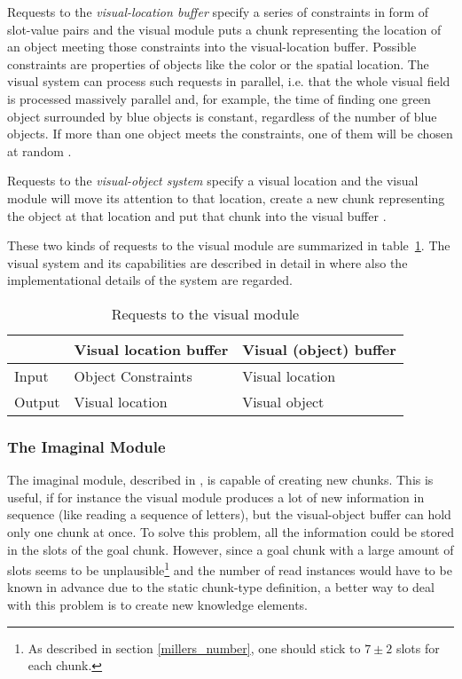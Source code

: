 Requests to the \emph{visual-location buffer} specify a series of constraints in form of slot-value pairs and the visual module puts a chunk representing the location of an object meeting those constraints into the visual-location buffer. Possible constraints are properties of objects like the color or the spatial location. The visual system can process such requests in parallel, i.e. that the whole visual field is processed massively parallel and, for example, the time of finding one green object surrounded by blue objects is constant, regardless of the number of blue objects. If more than one object meets the constraints, one of them will be chosen at random \cites[1039]{anderson_integrated_2004}[68]{anderson_how_2007}.

Requests to the \emph{visual-object system} specify a visual location and the visual module will move its attention to that location, create a new chunk representing the object at that location and put that chunk into the visual buffer \cite[unit 2, chapter 2.5.3]{actr_tutorial}. 

These two kinds of requests to the visual module are summarized in table~\ref{tab:visual_module_requests}. The visual system and its capabilities are described in detail in \cite[unit 2]{actr_tutorial} where also the implementational details of the system are regarded.

\begin{table}[hbt]
\caption{Requests to the visual module}
\label{tab:visual_module_requests}
\begin{center}
\begin{tabular}{|l|ll|}
\hline
 & Visual location buffer & Visual (object) buffer\\
\hline
Input & Object Constraints & Visual location\\
Output & Visual location & Visual object\\
\hline
\end{tabular}
\end{center}
\end{table}

\subsubsection{The Imaginal Module}
\label{actr:imaginal_module}

The imaginal module, described in \cite[unit 2]{actr_tutorial}, is capable of creating new chunks. This is useful, if for instance the visual module produces a lot of new information in sequence (like reading a sequence of letters), but the visual-object buffer can hold only one chunk at once. To solve this problem, all the information could be stored in the slots of the goal chunk. However, since a goal chunk with a large amount of slots seems to be unplausible\footnote{As described in section \ref{millers_number}, one should stick to $7 \pm 2$ slots for each chunk.} and the number of read instances would have to be known in advance due to the static chunk-type definition, a better way to deal with this problem is to create new knowledge elements.

